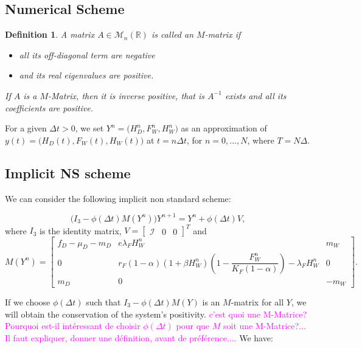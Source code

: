 \documentclass{article}
\newcommand{\lfw}{\lambda_{F}}
\newcommand{\lfw}{\lambda_{F}}
\newcommand{\cI}{\mathcal{I}}
\newcommand{\YD}[1]{\textcolor{magenta}{#1}}
\newtheorem{definition}{Definition}
\begin{document}
\subsection{Numerical Scheme}
\begin{definition} A matrix $A \in \mathcal{M}_n (\mathbb{R})$ is called an $M$-matrix if\begin{itemize}
\item all its off-diagonal term are negative
\item and its real eigenvalues are positive.
\end{itemize}

If $A$ is a $M$-Matrix, then it is inverse positive, that is $A^{-1}$ exists and all its coefficients are positive.


\end{definition}


For a given $\Delta t>0$, we set $Y^n=\Big(H_D^n,F_W^n,H_W^n \Big)$ as an approximation of $y(t)=\Big(H_D(t),F_W(t),H_W(t)\Big)$ at $t=n\Delta t$, for $n=0,...,N$, where $T=N\Delta$.


\subsection{Implicit NS scheme}
We can consider the following implicit non standard scheme:

\begin{equation} \label{NSImplicit scheme}
\Big(I_3 - \phi(\Delta t) M(Y^n) \Big) Y^{n+1} = Y^{n} + \phi(\Delta t)V,
\end{equation}
where $I_3$ is the identity matrix, $V = \begin{bmatrix}
\cI & 0 & 0
\end{bmatrix}^T$ and 
\begin{equation}
M(Y^n) = \begin{bmatrix}
f_D - \mu_D - m_D & e \lfw H_W^n & m_W \\
0 & r_F(1-\alpha)(1+\beta H_W^n)\left(1 - \dfrac{F_W^n}{K_F(1 - \alpha)} \right) - \lfw H_W^n & 0 \\
m_D & 0 & -m_W
\end{bmatrix}.
\end{equation}


If we choose $\phi(\Delta t)$ such that $I_3 - \phi(\Delta t) M(Y) $ is an $M$-matrix for all $Y$, we will obtain the conservation of the system's positivity. 
\YD{c'est quoi une M-Matrice? Pourquoi est-il intéressant de choisir $\phi(\Delta t)$ pour que $M$ soit une M-Matrice?... Il faut expliquer, donner une définition, avant de préférence....}
We have:
\end{document}
